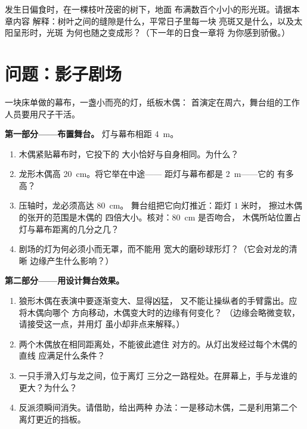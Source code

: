 \begin{exercise}[$\star\star\star$]\label{exo:g6:light-propagation:12}
发生日偏食时，在一棵枝叶茂密的树下，地面
布满数百个小小的形光斑。请据本章内容
解释：树叶之间的缝隙是什么，平常日子里每一块
亮斑又是什么，以及太阳呈形时，光斑
为何也随之变成形？（下一年的日食一章将
为你感到骄傲。）
\end{exercise}

\section{问题：影子剧场}

\begin{problem}\label{pb:g6:light-propagation:1}
一块床单做的幕布，一盏小而亮的灯，纸板木偶：
首演定在周六，舞台组的工作人员要用尺子干活。

\medskip\noindent\textbf{第一部分——布置舞台。}
灯与幕布相距 \qty{4}{m}。
\begin{enumerate}
  \item 木偶紧贴幕布时，它投下的
        大小恰好与自身相同。为什么？
  \item 龙形木偶高 \qty{20}{cm}。将它举在中途——
        距灯与幕布都是 \qty{2}{m}——它的
        有多高？
  \item 压轴时，龙必须高达 \qty{80}{cm}。
        舞台组把它向灯推近：距灯 $1$ 米时，
        擦过木偶的张开的范围是木偶的
        四倍大小。核对：\qty{80}{cm} 是否吻合，
        木偶所站位置占灯与幕布距离的几分之几？
  \item 剧场的灯为何必须小而无罩，而不能用
        宽大的磨砂球形灯？（它会对龙的清晰
        边缘产生什么影响？）
\end{enumerate}

\medskip\noindent\textbf{第二部分——用设计舞台效果。}
\begin{enumerate}[resume]
  \item 狼形木偶在表演中要逐渐变大、显得凶猛，
        又不能让操纵者的手臂露出。应将木偶向哪个
        方向移动，木偶变大时的边缘有何变化？
        （边缘会略微变软，请接受这一点，并用灯
        虽小却非点来解释。）
  \item 两个木偶放在相同距离处，不能彼此遮住
        对方的。从灯出发经过每个木偶的直线
        应满足什么条件？
  \item 一只手滑入灯与龙之间，位于离灯
        三分之一路程处。在屏幕上，手与龙谁的
        更大？为什么？
  \item 反派须瞬间消失。请借助，给出两种
        办法：一是移动木偶，二是利用第二个
        离灯更近的挡板。
\end{enumerate}


\end{problem}
